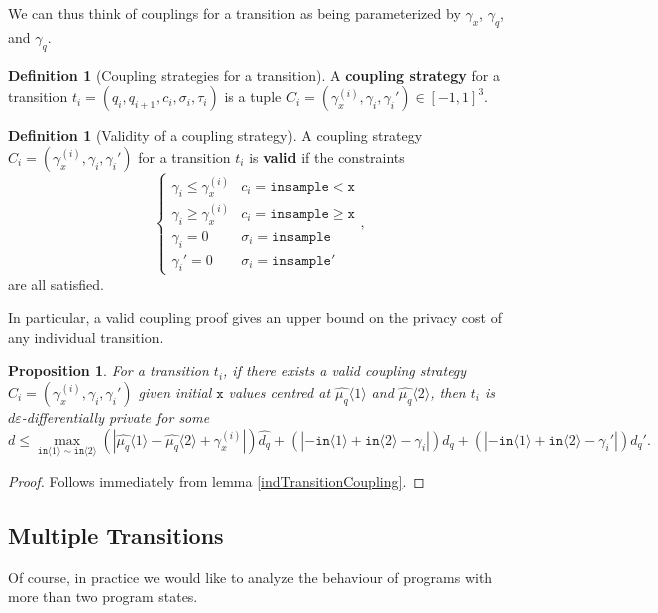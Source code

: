 \documentclass[12pt]{article}
\newcommand{\gguard}[1][x]{\texttt{insample}\geq #1}
\newcommand{\lguard}[1][x]{\texttt{insample} < #1}
\newcommand{\brangle}[1]{\langle #1 \rangle}
\newtheorem{prop}[thm]{Proposition}
\theoremstyle{definition}
\newtheorem{defn}[thm]{Definition}
\begin{document}
We can thus think of couplings for a transition as being parameterized by $\gamma_x$, $\gamma_q$, and $\gamma_q$. 

\begin{defn}[Coupling strategies for a transition]
    A \textbf{coupling strategy} for a transition $t_i = (q_i, q_{i+1}, c_i, \sigma_i, \tau_i)$ is a tuple $C_i = (\gamma_x^{(i)}, \gamma_i, \gamma_i')\in [-1, 1]^3$. 
\end{defn}

\begin{defn}[Validity of a coupling strategy]
    A coupling strategy $C_i =(\gamma_x^{(i)}, \gamma_i, \gamma_i')$ for a transition $t_i$ is \textbf{valid} if the constraints \[
        \begin{cases}
          \gamma_i\leq\gamma_x^{(i)} & c_i = \lguard[\texttt{x}]\\
          \gamma_i\geq\gamma_x^{(i)} & c_i = \gguard[\texttt{x}]\\
          \gamma_i=0 & \sigma_i = \texttt{insample}\\
          \gamma_i'=0 & \sigma_i = \texttt{insample}'
        \end{cases},
      \]
      are all satisfied. 
\end{defn}

In particular, a valid coupling proof gives an upper bound on the privacy cost of any individual transition. 
\begin{prop}\label{indivTransitionCouplingProp}
    For a transition $t_i$, if there exists a valid coupling strategy $C_i=(\gamma_x^{(i)}, \gamma_i, \gamma_i')$ given initial $\texttt{x}$ values centred at $\hat{\mu_q}\brangle{1}$ and $\hat{\mu_q}\brangle{2}$, then $t_i$ is $d\varepsilon$-differentially private for some 
    \[d\leq \max_{\texttt{in}\brangle{1}\sim\texttt{in}\brangle{2}} (|\hat{\mu_q}\brangle{1}-\hat{\mu_q}\brangle{2}+\gamma_x^{(i)}|)\hat{d_q}+(|-\texttt{in}\brangle{1}+\texttt{in}\brangle{2}-\gamma_i|)d_q+(|-\texttt{in}\brangle{1}+\texttt{in}\brangle{2}-\gamma_i'|)d_q'.\]
\end{prop}
\begin{proof}
    Follows immediately from lemma \ref{indTransitionCoupling}.
\end{proof}

\subsection{Multiple Transitions}

Of course, in practice we would like to analyze the behaviour of programs with more than two program states.
\end{document}
